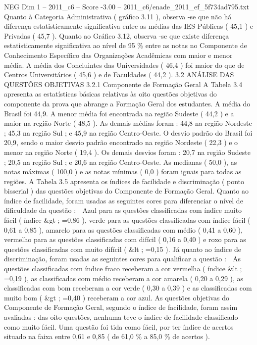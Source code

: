 \begin{textsample}{NEG Dim 1 – 2011\_c6 – Score -3.00 – 2011\_c6/enade\_2011\_ef\_5f734ad795.txt}
Quanto à Categoria Administrativa ( gráfico 3.11 ), observa -se que não há diferença estatisticamente significativa entre as médias das IES Públicas ( 45,1 ) e Privadas ( 45,7 ).
Quanto ao Gráfico 3.12, observa -se que existe diferença estatisticamente significativa ao nível de 95 \% entre as notas no Componente de Conhecimento Específico das Organizações Acadêmicas com maior e menor média.
A média dos Concluintes das Universidades ( 46,4 ) foi maior do que de Centros Universitários ( 45,6 ) e de Faculdades ( 44,2 ). 3.2 ANÁLISE DAS QUESTÕES OBJETIVAS 3.2.1 Componente de Formação Geral A Tabela 3.4 apresenta as estatísticas básicas relativas às oito questões objetivas do componente da prova que abrange a Formação Geral dos estudantes.
A média do Brasil foi 44,9.
A menor média foi encontrada na região Sudeste ( 44,2 ) e a maior na região Norte ( 48,5 ).
As demais médias foram : 44,8 na região Nordeste ; 45,3 na região Sul ; e 45,9 na região Centro-Oeste.
O desvio padrão do Brasil foi 20,9, sendo o maior desvio padrão encontrado na região Nordeste ( 22,3 ) e o menor na região Norte ( 19,4 ).
Os demais desvios foram : 20,7 na região Sudeste ; 20,5 na região Sul ; e 20,6 na região Centro-Oeste.
As medianas ( 50,0 ), as notas máximas ( 100,0 ) e as notas mínimas ( 0,0 ) foram iguais para todas as regiões.
A Tabela 3.5 apresenta os índices de facilidade e discriminação ( ponto bisserial ) das questões objetivas do Componente de Formação Geral.
Quanto ao índice de facilidade, foram usadas as seguintes cores para diferenciar o nível de dificuldade da questão :  Azul para as questões classificadas com índice muito fácil ( índice \&gt ; =0,86 ), verde para as questões classificadas com índice fácil ( 0,61 a 0,85 ), amarelo para as questões classificadas com médio ( 0,41 a 0,60 ), vermelho para as questões classificadas com difícil ( 0,16 a 0,40 ) e roxo para as questões classificadas com muito difícil ( \&lt ; =0,15 ).
Já quanto ao índice de discriminação, foram usadas as seguintes cores para qualificar a questão :  As questões classificadas com índice fraco receberam a cor vermelha ( índice \&lt ; =0,19 ), as classificadas com médio receberam a cor amarela ( 0,20 a 0,29 ), as classificadas com bom receberam a cor verde ( 0,30 a 0,39 ) e as classificadas com muito bom ( \&gt ; =0,40 ) receberam a cor azul.
As questões objetivas do Componente de Formação Geral, segundo o índice de facilidade, foram assim avaliadas : das oito questões, nenhuma teve o índice de facilidade classificado como muito fácil.
Uma questão foi tida como fácil, por ter índice de acertos situado na faixa entre 0,61 e 0,85 ( de 61,0 \% a 85,0 \% de acertos ).

\end{textsample}
